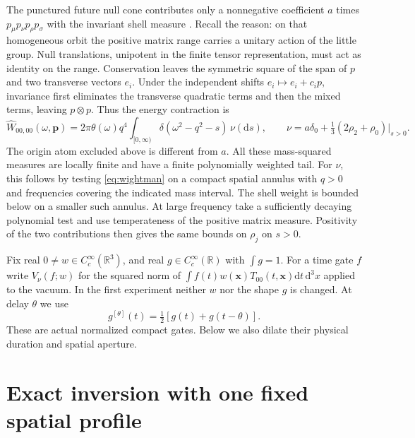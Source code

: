 \documentclass[11pt]{article}
\theoremstyle{remark}
\newcommand{\dd}{\mathrm d}
\newcommand{\R}{\mathbb R}
\begin{document}
The punctured future null cone contributes only a nonnegative
coefficient \(a\) times \(p_\mu p_\nu p_\rho p_\sigma\) with the
invariant shell measure \cite{P45}. Recall the reason: on that
homogeneous orbit the positive matrix range carries a unitary
action of the little group. Null translations, unipotent in the
finite tensor representation, must act as identity on the range.
Conservation leaves the symmetric square of the span of \(p\) and
two transverse vectors \(e_i\). Under the independent shifts
\(e_i\mapsto e_i+c_i p\), invariance first eliminates the transverse
quadratic terms and then the mixed terms, leaving \(p\otimes p\).
Thus the energy contraction is
\begin{equation}
 \widehat W_{00,00}(\omega,\mathbf p)
 =2\pi\theta(\omega)q^4\int_{[0,\infty)}
        \delta(\omega^2-q^2-s)\,\nu(\dd s),\qquad
 \nu=a\delta_0+\tfrac13(2\rho_2+\rho_0)|_{s>0}.
 \label{eq:wightman}
\end{equation}
The origin atom excluded above is different from \(a\). All these
mass-squared measures are locally finite and have a finite
polynomially weighted tail. For \(\nu\), this follows by testing
\eqref{eq:wightman} on a compact spatial annulus with \(q>0\) and
frequencies covering the indicated mass interval. The shell weight
is bounded below on a smaller such annulus. At large frequency
take a sufficiently decaying polynomial test and use temperateness
of the positive matrix measure. Positivity of the two contributions
then gives the same bounds on \(\rho_j\) on \(s>0\).

Fix real \(0\ne w\in C_c^\infty(\R^3)\), and real
\(g\in C_c^\infty(\R)\) with \(\int g=1\). For a time gate \(f\)
write \(V_\nu(f;w)\) for the squared norm of
\(\int f(t)w(\mathbf x)T_{00}(t,\mathbf x)\dd t\,\dd^3x\)
applied to the vacuum. In the first experiment neither \(w\) nor the
shape \(g\) is changed. At delay \(\theta\) we use
\[
            g^{[\theta]}(t)=\tfrac12[g(t)+g(t-\theta)].
\]
These are actual normalized compact gates. Below we also dilate
their physical duration and spatial aperture.

\section{Exact inversion with one fixed spatial profile}
\end{document}
